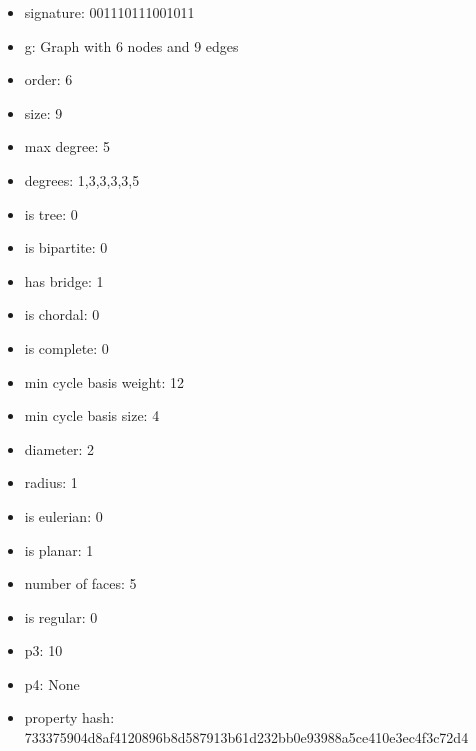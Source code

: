\begin{itemize}
\item signature: 001110111001011
\item g: Graph with 6 nodes and 9 edges
\item order: 6
\item size: 9
\item max degree: 5
\item degrees: 1,3,3,3,3,5
\item is tree: 0
\item is bipartite: 0
\item has bridge: 1
\item is chordal: 0
\item is complete: 0
\item min cycle basis weight: 12
\item min cycle basis size: 4
\item diameter: 2
\item radius: 1
\item is eulerian: 0
\item is planar: 1
\item number of faces: 5
\item is regular: 0
\item p3: 10
\item p4: None
\item property hash: 733375904d8af4120896b8d587913b61d232bb0e93988a5ce410e3ec4f3c72d4
\end{itemize}
\newpage
\begin{figure}
\end{figure}
